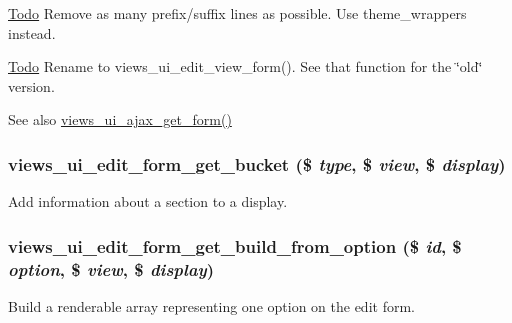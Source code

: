 \begin{Desc}
\item[\hyperlink{todo__todo000076}{Todo}]Remove as many prefix/suffix lines as possible. Use theme\_\-wrappers instead.\end{Desc}
\begin{Desc}
\item[\hyperlink{todo__todo000077}{Todo}]Rename to views\_\-ui\_\-edit\_\-view\_\-form(). See that function for the \char`\"{}old\char`\"{} version.\end{Desc}
\begin{DoxySeeAlso}{See also}
\hyperlink{views__ui_8module_a869b55ec9965e41d8498ff9269b652b7}{views\_\-ui\_\-ajax\_\-get\_\-form()} 
\end{DoxySeeAlso}
\hypertarget{admin_8inc_a926e3094317ec9bef205685362981d39}{
\subsubsection[{views\_\-ui\_\-edit\_\-form\_\-get\_\-bucket}]{\setlength{\rightskip}{0pt plus 5cm}views\_\-ui\_\-edit\_\-form\_\-get\_\-bucket (\$ {\em type}, \/  \$ {\em view}, \/  \$ {\em display})}}
\label{admin_8inc_a926e3094317ec9bef205685362981d39}
Add information about a section to a display. \hypertarget{admin_8inc_ac3afa3d1dfc328770b843c2127a2f9f8}{
\subsubsection[{views\_\-ui\_\-edit\_\-form\_\-get\_\-build\_\-from\_\-option}]{\setlength{\rightskip}{0pt plus 5cm}views\_\-ui\_\-edit\_\-form\_\-get\_\-build\_\-from\_\-option (\$ {\em id}, \/  \$ {\em option}, \/  \$ {\em view}, \/  \$ {\em display})}}
\label{admin_8inc_ac3afa3d1dfc328770b843c2127a2f9f8}
Build a renderable array representing one option on the edit form.

